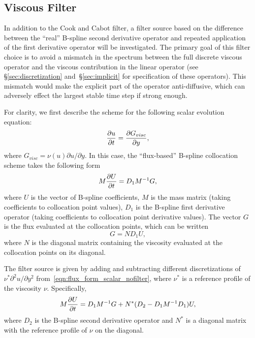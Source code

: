 \subsection{Viscous Filter}
In addition to the Cook and Cabot filter, a filter source based on the
difference between the ``real'' B-spline second derivative operator
and repeated application of the first derivative operator will be
investigated.  The primary goal of this filter choice is to avoid a
mismatch in the spectrum between the full discrete viscous operator
and the viscous contribution in the linear operator (see
\S\ref{sec:discretization} and~\S\ref{sec:implicit} for specification
of these operators).  This mismatch would make the explicit part of
the operator anti-diffusive, which can adversely effect the largest
stable time step if strong enough.  

For clarity, we first describe the scheme for the following scalar
evolution equation:
%
\begin{equation*}
\frac{\partial u}{\partial t} = \frac{\partial G_{visc}}{\partial y},
\end{equation*}
% 
where $G_{visc} = \nu(u) \partial u / \partial y$.  In this case,
the ``flux-based'' B-spline collocation scheme takes the following
form
%
\begin{equation}
\label{eqn:flux_form_scalar_nofilter}
M \frac{\partial U}{\partial t} = D_1 M^{-1} G,
\end{equation}
% 
where $U$ is the vector of B-spline coefficients, $M$ is the mass
matrix (taking coefficients to collocation point values), $D_1$ is the
B-spline first derivative operator (taking coefficients to collocation
point derivative values).  The vector $G$ is the flux
evaluated at the collocation points, which can be written
%
\begin{equation*}
G = N D_1 U,
\end{equation*}
% 
where $N$ is the diagonal matrix containing the viscosity evaluated
at the collocation points on its diagonal.

The filter source is given by adding and subtracting different
discretizations of $\nu^* \partial^2 u / \partial y^2$
from~\eqref{eqn:flux_form_scalar_nofilter}, where $\nu^*$ is a
reference profile of the viscosity $\nu$.  Specifically,
%
\begin{equation}
\label{eqn:flux_form_scalar_wfilter}
M \frac{\partial U}{\partial t} = D_1 M^{-1} G + N^* (D_2 - D_1 M^{-1} D_1) U,
\end{equation}
% 
where $D_2$ is the B-spline second derivative operator and $N^*$ is
a diagonal matrix with the reference profile of $\nu$ on the diagonal.

